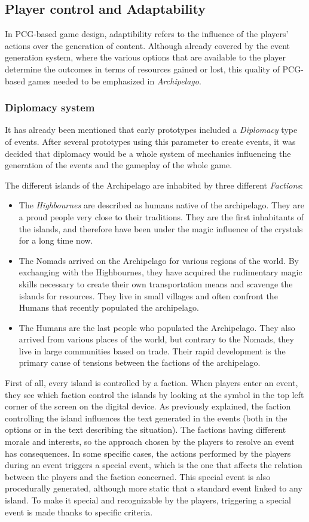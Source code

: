 \subsection{Player control and Adaptability}
In PCG-based game design, adaptibility refers to the influence of the players' actions over the generation of content. Although already covered by the event generation system, where the various options that are available to the player determine the outcomes in terms of resources gained or lost, this quality of PCG-based games needed to be emphasized in \textit{Archipelago}. 
\subsubsection{Diplomacy system}
It has already been mentioned that early prototypes included a \textit{Diplomacy} type of events. After several prototypes using this parameter to create events, it was decided that diplomacy would be a whole system of mechanics influencing the generation of the events and the gameplay of the whole game. 

The different islands of the Archipelago are inhabited by three different \textit{Factions}:
\begin{itemize}
\item The \textit{Highbournes} are described as humans native of the archipelago. They are a proud people very close to their traditions. They are the first inhabitants of the islands, and therefore have been under the magic influence of the crystals for a long time now.
\item The Nomads arrived on the Archipelago for various regions of the world. By exchanging with the Highbournes, they have acquired the rudimentary magic skills necessary to create their own transportation means and scavenge the islands for resources. They live in small villages and often confront the Humans that recently populated the archipelago.
\item The Humans are the last people who populated the Archipelago. They also arrived from various places of the world, but contrary to the Nomads, they live in large communities based on trade. Their rapid development is the primary cause of tensions between the factions of the archipelago.
\end{itemize}
First of all, every island is controlled by a faction. When players enter an event, they see which faction control the islands by looking at the symbol in the top left corner of the screen on the digital device. As previously explained, the faction controlling the island influences the text generated in the events (both in the options or in the text describing the situation). The factions having different morale and interests, so the approach chosen by the players to resolve an event has consequences. In some specific cases, the actions performed by the players during an event triggers a special event, which is the one that affects the relation between the players and the faction concerned. This special event is also procedurally generated, although more static that a standard event linked to any island. To make it special and recognizable by the players, triggering a special event is made thanks to specific criteria.

